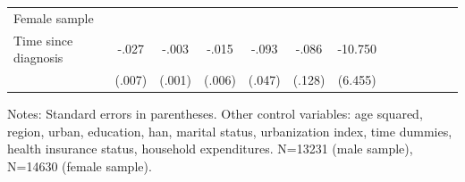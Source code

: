 \begin{table}[h]
\begin{adjustbox}{max width=\linewidth}
\begin{threeparttable}
{\begin{tabular}{l*{6}{S
S}}
Female sample &&&&&&\\
Time since diagnosis&    -.027\sym{***}&    -.003\sym{*}  &    -.015\sym{***}&    -.093\sym{**} &    -.086         &  -10.750\sym{*}  \\
                &   (.007)         &   (.001)         &   (.006)         &   (.047)         &   (.128)         &  (6.455)         \\          
\bottomrule
\end{tabular}
\begin{tablenotes}
\item Notes:   Standard errors in parentheses.
Other control variables: age squared, region, urban, education, han, marital status, urbanization index, time dummies, health insurance status, household expenditures. N=13231 (male sample), N=14630 (female sample).
\end{tablenotes}
}
\end{threeparttable}
\end{adjustbox}
\end{table}



